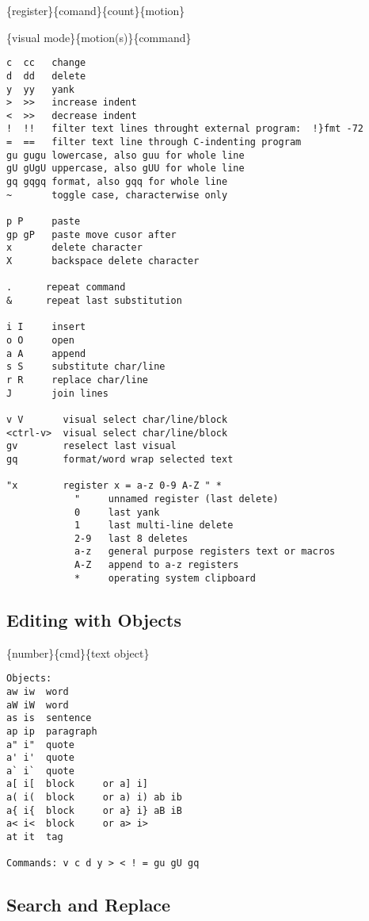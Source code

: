 \documentclass{article}
\begin{document}
\{register\}\{comand\}\{count\}\{motion\}

\{visual mode\}\{motion(s)\}\{command\}

\begin{verbatim}
c  cc   change
d  dd   delete
y  yy   yank
>  >>   increase indent
<  >>   decrease indent
!  !!   filter text lines throught external program:  !}fmt -72
=  ==   filter text line through C-indenting program
gu gugu lowercase, also guu for whole line
gU gUgU uppercase, also gUU for whole line
gq gqgq format, also gqq for whole line
~       toggle case, characterwise only

p P     paste
gp gP   paste move cusor after
x       delete character
X       backspace delete character

.      repeat command
&      repeat last substitution

i I     insert
o O     open
a A     append
s S     substitute char/line
r R     replace char/line
J       join lines

v V       visual select char/line/block
<ctrl-v>  visual select char/line/block
gv        reselect last visual
gq        format/word wrap selected text

"x        register x = a-z 0-9 A-Z " *
            "     unnamed register (last delete)
            0     last yank
            1     last multi-line delete
            2-9   last 8 deletes
            a-z   general purpose registers text or macros
            A-Z   append to a-z registers
            *     operating system clipboard
\end{verbatim}

\newpage

\subsection{Editing with Objects}\label{editing-with-objects}

\{number\}\{cmd\}\{text object\}

\begin{verbatim}
Objects:
aw iw  word
aW iW  word
as is  sentence
ap ip  paragraph
a" i"  quote 
a' i'  quote
a` i`  quote
a[ i[  block     or a] i]
a( i(  block     or a) i) ab ib 
a{ i{  block     or a} i} aB iB
a< i<  block     or a> i>
at it  tag

Commands: v c d y > < ! = gu gU gq
\end{verbatim}

\subsection{Search and Replace}\label{search-and-replace}
\end{document}
